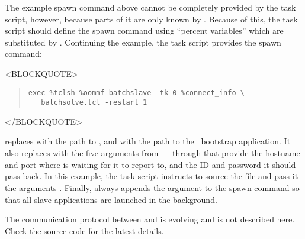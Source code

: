 The example spawn command above cannot be completely provided by
the task script, however, because parts of it are only known
by .  Because of this, the task script should
define the spawn command using ``percent variables'' which are
substituted by .  Continuing the example, the task
script provides the spawn command:
\begin{rawhtml}
<BLOCKQUOTE>
\end{rawhtml}
\begin{quote}
\begin{verbatim}
exec %tclsh %oommf batchslave -tk 0 %connect_info \
   batchsolve.tcl -restart 1
\end{verbatim}
\end{quote}
\begin{rawhtml}
</BLOCKQUOTE>
\end{rawhtml}
 replaces  with the path to ,
and  with the path to the \OOMMF\ bootstrap application.
It also replaces  with the five arguments from \verb+--+
through  that provide 
the hostname and port where  is waiting for
it to report to, and the ID and password it should pass back.
In this example, the task script instructs  to source the
file  and pass it the arguments .
Finally,  always appends the argument \cd{\&} to
the spawn command so that all slave applications are launched in the
background.

The communication protocol between
 and  is evolving and is not
described here.  Check the source code for the latest details.

